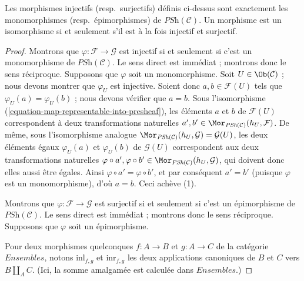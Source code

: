 \begin{lemma}
\label{lemma-mono-epi}
Les morphismes injectifs (resp.\ surjectifs) définis ci-dessus
sont exactement les monomorphismes (resp.\ épimorphismes) de
$\textit{PSh}(\mathcal{C})$. Un morphisme est un isomorphisme
si et seulement s’il est à la fois injectif et surjectif.
\end{lemma}

\begin{proof}
Montrons que $\varphi : \mathcal{F} \to
\mathcal{G}$ est injectif si et seulement si c’est un monomorphisme
de $\textit{PSh}(\mathcal{C})$. Le sens direct
est immédiat ; montrons donc le sens réciproque.
Supposons que $\varphi$ soit un monomorphisme. Soit
$U \in \Ob(\mathcal{C})$ ; nous devons montrer que $\varphi_U$ est
injective. Soient donc $a, b \in \mathcal{F}(U)$ tels que
$\varphi_U (a) = \varphi_U (b)$ ; nous devons vérifier que $a = b$.
Sous l’isomorphisme
(\ref{equation-map-representable-into-presheaf}), les éléments
$a$ et $b$ de $\mathcal{F}(U)$ correspondent à deux transformations
naturelles
$a', b' \in \Mor_{\textit{PSh}(\mathcal{C})}(h_U, \mathcal{F})$.
De même, sous l’isomorphisme analogue
$\Mor_{\textit{PSh}(\mathcal{C})}(h_U, \mathcal{G})
= \mathcal{G}(U)$,
les deux éléments égaux $\varphi_U (a)$ et $\varphi_U (b)$ de
$\mathcal{G}(U)$ correspondent aux deux transformations naturelles
$\varphi \circ a', \varphi \circ b'
\in \Mor_{\textit{PSh}(\mathcal{C})}(h_U, \mathcal{G})$,
qui doivent donc elles aussi être égales. Ainsi
$\varphi \circ a' = \varphi \circ b'$, et par conséquent $a' = b'$
(puisque $\varphi$ est un monomorphisme), d’où $a = b$. Ceci achève (1).

\medskip\noindent
Montrons que $\varphi : \mathcal{F} \to
\mathcal{G}$ est surjectif si et seulement si c’est un épimorphisme
de $\textit{PSh}(\mathcal{C})$. Le sens direct
est immédiat ; montrons donc le sens réciproque.
Supposons que $\varphi$ soit un épimorphisme.

\medskip\noindent
Pour deux morphismes quelconques $f : A \to B$ et $g : A \to C$ de la
catégorie $\textit{Ensembles}$, notons $\text{inl}_{f,g}$ et
$\text{inr}_{f,g}$ les deux applications canoniques de
$B$ et $C$ vers $B \coprod_A C$. (Ici, la somme amalgamée est
calculée dans $\textit{Ensembles}$.)


\end{proof}
